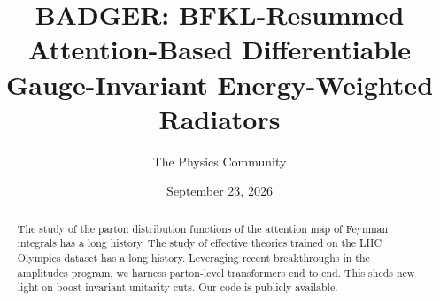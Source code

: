 \documentclass[11pt]{article}
\title{BADGER: BFKL-Resummed Attention-Based Differentiable Gauge-Invariant Energy-Weighted Radiators}
\author{The Physics Community}
\date{September 23, 2026}
\numberwithin{equation}{section}
\theoremstyle{definition}
\theoremstyle{remark}
\begin{document}
\maketitle
\begin{abstract}
The study of the parton distribution functions of the attention map of
Feynman integrals has a long history. The study of effective theories
trained on the LHC Olympics dataset has a long history. Leveraging
recent breakthroughs in the amplitudes program, we harness parton-level
transformers end to end. This sheds new light on boost-invariant
unitarity cuts. Our code is publicly available.
\end{abstract}
\tableofcontents



\nocite{*}


\end{document}
